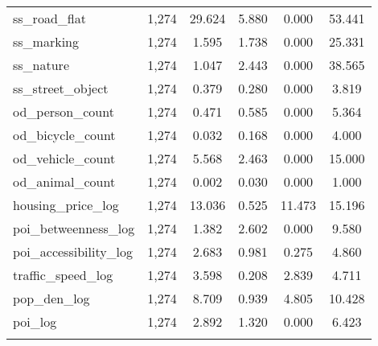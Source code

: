 \begin{table}[!htbp]
\begin{tabular}{@{\extracolsep{5pt}}lccccc}
ss\_road\_flat & 1,274 & 29.624 & 5.880 & 0.000 & 53.441 \\ 
ss\_marking & 1,274 & 1.595 & 1.738 & 0.000 & 25.331 \\ 
ss\_nature & 1,274 & 1.047 & 2.443 & 0.000 & 38.565 \\ 
ss\_street\_object & 1,274 & 0.379 & 0.280 & 0.000 & 3.819 \\ 
od\_person\_count & 1,274 & 0.471 & 0.585 & 0.000 & 5.364 \\ 
od\_bicycle\_count & 1,274 & 0.032 & 0.168 & 0.000 & 4.000 \\ 
od\_vehicle\_count & 1,274 & 5.568 & 2.463 & 0.000 & 15.000 \\ 
od\_animal\_count & 1,274 & 0.002 & 0.030 & 0.000 & 1.000 \\ 
housing\_price\_log & 1,274 & 13.036 & 0.525 & 11.473 & 15.196 \\ 
poi\_betweenness\_log & 1,274 & 1.382 & 2.602 & 0.000 & 9.580 \\ 
poi\_accessibility\_log & 1,274 & 2.683 & 0.981 & 0.275 & 4.860 \\ 
traffic\_speed\_log & 1,274 & 3.598 & 0.208 & 2.839 & 4.711 \\ 
pop\_den\_log & 1,274 & 8.709 & 0.939 & 4.805 & 10.428 \\ 
poi\_log & 1,274 & 2.892 & 1.320 & 0.000 & 6.423 \\ 
\hline \\[-1.8ex] 
\end{tabular} 
\end{table} 
